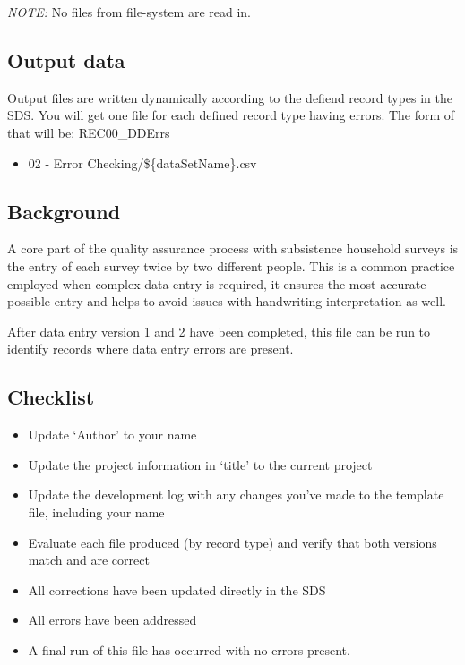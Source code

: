 \documentclass[
]{article}
\providecommand{\tightlist}{%
  \setlength{\itemsep}{0pt}\setlength{\parskip}{0pt}}
\begin{document}
\emph{NOTE:} No files from file-system are read in.

\subsection{Output data}\label{output-data}

Output files are written dynamically according to the defiend record
types in the SDS. You will get one file for each defined record type
having errors. The form of that will be: REC00\_DDErrs

\begin{itemize}
\tightlist
\item
  02 - Error Checking/\$\{dataSetName\}.csv
\end{itemize}

\subsection{Background}\label{background}

A core part of the quality assurance process with subsistence household
surveys is the entry of each survey twice by two different people. This
is a common practice employed when complex data entry is required, it
ensures the most accurate possible entry and helps to avoid issues with
handwriting interpretation as well.

After data entry version 1 and 2 have been completed, this file can be
run to identify records where data entry errors are present.

\subsection{Checklist}\label{checklist}

\begin{itemize}
\tightlist
\item
  Update `Author' to your name\\
\item
  Update the project information in `title' to the current project\\
\item
  Update the development log with any changes you've made to the
  template file, including your name\\
\item
  Evaluate each file produced (by record type) and verify that both
  versions match and are correct\\
\item
  All corrections have been updated directly in the SDS\\
\item
  All errors have been addressed\\
\item
  A final run of this file has occurred with no errors present.
\end{itemize}
\end{document}
